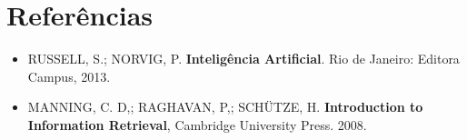 \documentclass[12pt,a4paper,oneside]{article}
\begin{document}
\section{Referências}

\begin{itemize}
	\item RUSSELL, S.; NORVIG, P. {\bf Inteligência Artificial}. Rio de Janeiro: Editora Campus, 2013.
	\item MANNING, C. D,; RAGHAVAN, P,; SCHÜTZE, H. {\bf Introduction to Information Retrieval}, Cambridge University Press. 2008.
\end{itemize}
\end{document}
